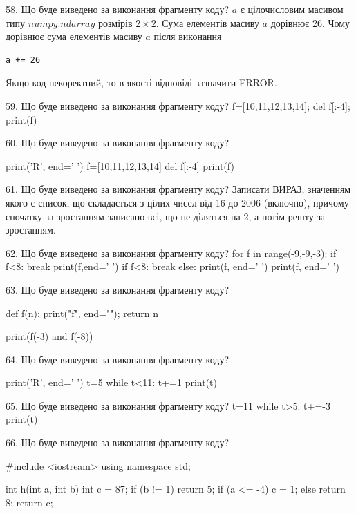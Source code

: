 \documentclass[11pt]{article}
\begin{document}
58. Що буде виведено за виконання фрагменту коду?
$a$ є цілочисловим масивом типу $numpy.ndarray$ розмірів $2{\times}2$. Сума елементів масиву $a$ дорівнює 26. Чому дорівнює сума елементів масиву $a$ після виконання 
\begin{verbatim}
a += 26
\end{verbatim}


Якщо код некоректний, то в якості відповіді зазначити ERROR.




59. Що буде виведено за виконання фрагменту коду?
f=[10,11,12,13,14]; del f[:-4]; print(f)

60. Що буде виведено за виконання фрагменту коду?

print('R', end=' ')
f=[10,11,12,13,14]
del f[:-4]
print(f)



61. Що буде виведено за виконання фрагменту коду?
Записати ВИРАЗ, значенням якого є список, що складається з цілих чисел від 16 до 2006 (включно), причому спочатку за зростанням записано всі, що не діляться на 2, а потім решту за зростанням.

62. Що буде виведено за виконання фрагменту коду?
for f in range(-9,-9,-3):
    if f<8:
        break
        print(f,end=' ')
    if f<8:
        break
else:
    print(f, end=' ')
print(f, end=' ')


63. Що буде виведено за виконання фрагменту коду?

def f(n):
    print("f", end="");
    return n

print(f(-3) and f(-8))


64. Що буде виведено за виконання фрагменту коду?

print('R', end=' ')
t=5
while t<11:
    t+=1
print(t)



65. Що буде виведено за виконання фрагменту коду?
t=11
   while t>5: t+=-3
   print(t)

66. Що буде виведено за виконання фрагменту коду?

#include <iostream>
using namespace std;

int h(int a, int b){
    int c = 87;
    if (b != 1)
        return 5;
    if (a <= -4)
         c = 1;
    else 
        return 8;
    return c;
}
\end{document}
